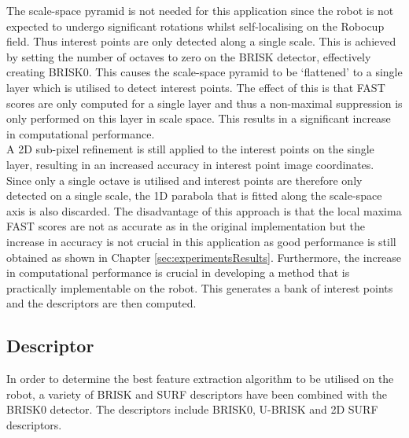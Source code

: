 The scale-space pyramid is not needed for this application since the robot is not expected to undergo significant rotations whilst self-localising on the Robocup field. Thus interest points are only detected along a single scale. This is achieved by setting the number of octaves to zero on the BRISK detector, effectively creating BRISK0. This causes the scale-space pyramid to be `flattened' to a single layer which is utilised to detect interest points. The effect of this is that FAST scores are only computed for a single layer and thus a non-maximal suppression is only performed on this layer in scale space. This results in a significant increase in computational performance. \\


A 2D sub-pixel refinement is still applied to the interest points on the single layer, resulting in an increased accuracy in interest point image coordinates.\\

Since only a single octave is utilised and interest points are therefore only detected on a single scale, the 1D parabola that is fitted along the scale-space axis \citep{Leutenegger2011} is also discarded. The disadvantage of this approach is that the local maxima FAST scores are not as accurate as in the original implementation but the increase in accuracy is not crucial in this application as good performance is still obtained as shown in Chapter \ref{sec:experimentsResults}. Furthermore, the increase in computational performance is crucial in developing a method that is practically implementable on the robot. This generates a bank of interest points and the descriptors are then computed.\\

\subsection{Descriptor}
\label{sec:BRISK0Describe}
In order to determine the best feature extraction algorithm to be utilised on the robot, a variety of BRISK and SURF descriptors have been combined with the BRISK0 detector. The descriptors include BRISK0, U-BRISK and 2D SURF descriptors.\\

